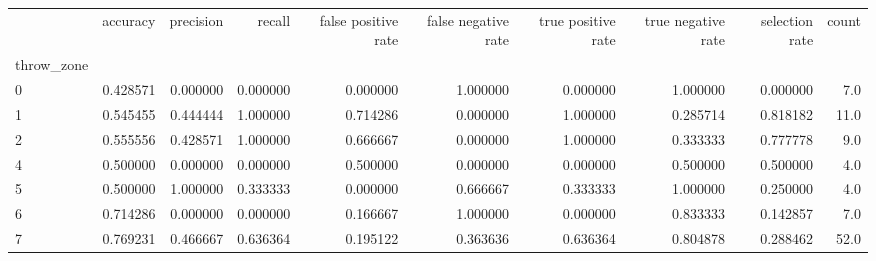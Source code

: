 \begin{tabular}{lrrrrrrrrr}
\toprule
{} &  accuracy &  precision &    recall &  false positive rate &  false negative rate &  true positive rate &  true negative rate &  selection rate &  count \\
throw\_zone &           &            &           &                      &                      &                     &                     &                 &        \\
\midrule
0          &  0.428571 &   0.000000 &  0.000000 &             0.000000 &             1.000000 &            0.000000 &            1.000000 &        0.000000 &    7.0 \\
1          &  0.545455 &   0.444444 &  1.000000 &             0.714286 &             0.000000 &            1.000000 &            0.285714 &        0.818182 &   11.0 \\
2          &  0.555556 &   0.428571 &  1.000000 &             0.666667 &             0.000000 &            1.000000 &            0.333333 &        0.777778 &    9.0 \\
4          &  0.500000 &   0.000000 &  0.000000 &             0.500000 &             0.000000 &            0.000000 &            0.500000 &        0.500000 &    4.0 \\
5          &  0.500000 &   1.000000 &  0.333333 &             0.000000 &             0.666667 &            0.333333 &            1.000000 &        0.250000 &    4.0 \\
6          &  0.714286 &   0.000000 &  0.000000 &             0.166667 &             1.000000 &            0.000000 &            0.833333 &        0.142857 &    7.0 \\
7          &  0.769231 &   0.466667 &  0.636364 &             0.195122 &             0.363636 &            0.636364 &            0.804878 &        0.288462 &   52.0 \\
\bottomrule
\end{tabular}
